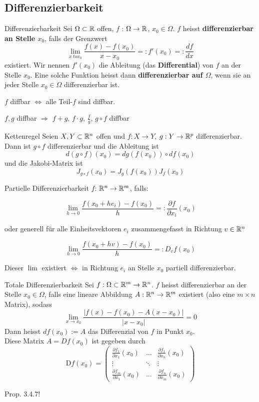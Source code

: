 \subsection{Differenzierbarkeit}

\begin{Definition}{Differenzierbarkeit}{}
    Sei $\Omega \subset \mathbb{R}$ offen, $f$ : $\Omega \to \mathbb{R}$, $x_0\in\Omega$. $f$ heisst \textbf{differenzierbar an Stelle $x_0$}, falls der Grenzwert
    \[
    \lim_{x\ to x_0} \frac{f(x) - f(x_0)}{x - x_0} =:
    f'(x_0) =:
    \frac{df}{dx}
    \]
    existiert. Wir nennen $f'(x_0)$ die Ableitung (das \textbf{Differential}) von $f$ an der Stelle $x_0$. Eine solche Funktion heisst dann \textbf{differenzierbar auf $\Omega$}, wenn sie an jeder Stelle $x_0 \in \Omega$ differenzierbar ist.
\end{Definition}

$f$ diffbar $\Leftrightarrow$ alle Teil-$f$ sind diffbar.

$f,g$ diffbar $\Rightarrow$ $f+g$, $f \cdot g$, $\frac{f}{g}$, $g \circ f$ diffbar

\begin{Satz}{Kettenregel}{}
	Seien $X,Y \subset \mathbb{R}^n$ offen und $f: X \to Y$, $g: Y \to \mathbb{R}^p$ differenzierbar. Dann ist $g \circ f$ differenzierbar und die Ableitung ist \[d(g\circ f)(x_0) = dg(f(x_0))\circ df(x_0)\] und die Jakobi-Matrix ist \[J_{g\circ f}(x_0) = J_g(f(x_0))J_f(x_0)\]
\end{Satz}


\begin{Definition}{Partielle Differenzierbarkeit}{}
	$f$: $\mathbb{R}^n \rightarrow \mathbb{R}^m$, falls:

	\[
    	\lim_{h \rightarrow 0} \frac{f(x_0 + h e_i)-f(x_0)}{h} =: \frac{\partial f}{\partial x_i}(x_0)
	\]

	oder generell für alle Einheitsvektoren $e_i$ zusammengefasst in Richtung $v \in \mathbb{R}^n$

	\[
    	\lim_{h \rightarrow 0} \frac{f(x_0 + h v)-f(x_0)}{h} =: D_v f(x_0)
	\]

	Dieser $\lim$ existiert $\Leftrightarrow$ in Richtung $e_i$ an Stelle $x_0$ partiell differenzierbar.
\end{Definition}

\begin{Definition}{Totale Differenzierbarkeit}{}
	Sei $f: \Omega \subset \mathbb{R}^m \to \mathbb{R}^n$. $f$ heisst differenzierbar an der Stelle $x_0 \in \Omega$, falls eine lineare Abbildung $A: \mathbb{R}^n \to \mathbb{R}^m$ existiert (also eine $m \times n$ Matrix), sodass \[\lim_{x \to x_0} \frac{|f(x) - f(x_0) - A(x - x_0)|}{|x - x_0|} = 0\] Dann heisst $df(x_0) := A$ das Differenzial von $f$ in Punkt $x_0$. \\
	Diese Matrix $A = Df(x_0)$ ist gegeben durch
	\[
		\text{D}f(x_0) =
        \begin{pmatrix}
            \frac{\partial f_1}{\partial x_1}(x_0)&\hdots&\frac{\partial f_1}{\partial x_n}(x_0)\\
            \vdots&\ddots&\vdots\\
            \frac{\partial f_m}{\partial x_1}(x_0)&\hdots&\frac{\partial f_n}{\partial x_m}(x_0)
        \end{pmatrix}
    \]
\end{Definition}

Prop. 3.4.7!

